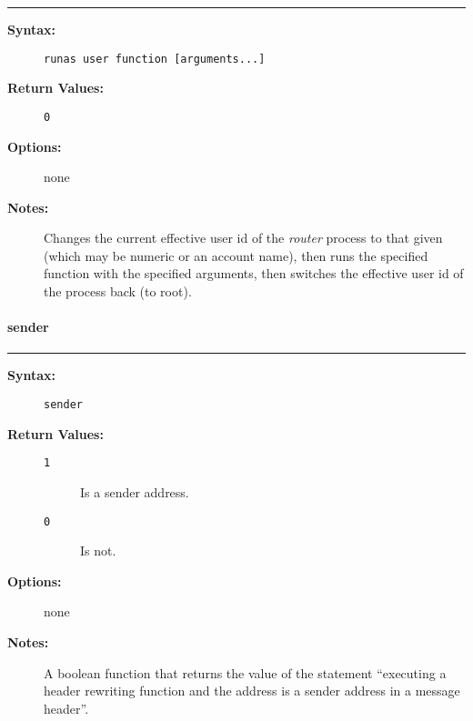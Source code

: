 \hrule
\begin{description}
\item[{\bf Syntax:}] \mbox{}

{\tt runas user function [arguments...]}

\item[{\bf Return Values:}] \mbox{}

\begin{description}
\item[{\tt 0}] \mbox{}



\end{description}


\item[{\bf Options:}] \mbox{}

none  

\item[{\bf Notes:}] \mbox{}

Changes the current effective user id 
of the {\em router\/} process to that given (which may be 
numeric or an account name), then runs the specified function 
with the specified arguments, then switches the effective 
user id of the process back (to root). 

\end{description}


\vspace {2pt}


\paragraph{sender}

\hrule
\begin{description}
\item[{\bf Syntax:}] \mbox{}

{\tt sender}

\item[{\bf Return Values:}] \mbox{}

\begin{description}
\item[{\tt 1}] \mbox{}

Is a sender address.

\item[{\tt 0}] \mbox{}

Is not.

\end{description}


\item[{\bf Options:}] \mbox{}

none  

\item[{\bf Notes:}] \mbox{}

A boolean function that returns the value of 
the statement ``executing a header rewriting function and the address 
is a sender address in a message header''. 

\end{description}


